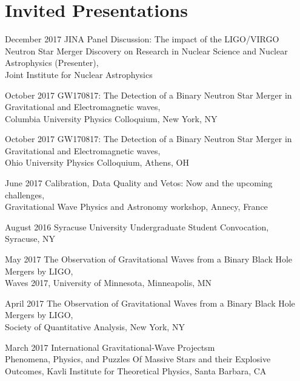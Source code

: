 \documentclass{cv}
\begin{document}
\section{Invited Presentations}
\begin{entry}
\item[December 2017] JINA Panel Discussion: The impact of the LIGO/VIRGO Neutron Star Merger Discovery on Research in Nuclear Science and Nuclear Astrophysics (Presenter),\\
{\small Joint Institute for Nuclear Astrophysics}

\item[October 2017] {GW170817: The Detection of a 
Binary Neutron Star Merger in Gravitational and Electromagnetic waves},\\
{\small Columbia University Physics Colloquium, New York, NY}

\item[October 2017] {GW170817: The Detection of a 
Binary Neutron Star Merger in Gravitational and Electromagnetic waves},\\
{\small Ohio University Physics Colloquium, Athens, OH}

\item[June 2017] {Calibration, Data Quality and Vetos: Now and the upcoming challenges},\\
{\small Gravitational Wave Physics and Astronomy workshop, Annecy, France}

\item[August 2016] {Syracuse University Undergraduate Student Convocation},\\
{\small Syracuse, NY}

\item[May 2017]{The Observation of Gravitational Waves from a Binary Black Hole Mergers by LIGO},\\
{\small Waves 2017, University of Minnesota, Minneapolis, MN}

\item[April 2017]{The Observation of Gravitational Waves from a Binary Black Hole Mergers by LIGO},\\
{\small Society of Quantitative Analysis, New York, NY}

\item[March 2017]{International Gravitational-Wave Projects}m\\
{\small Phenomena, Physics, and Puzzles Of Massive Stars and their Explosive Outcomes, Kavli Institute for Theoretical Physics, Santa Barbara, CA}


\end{entry}
\end{document}
